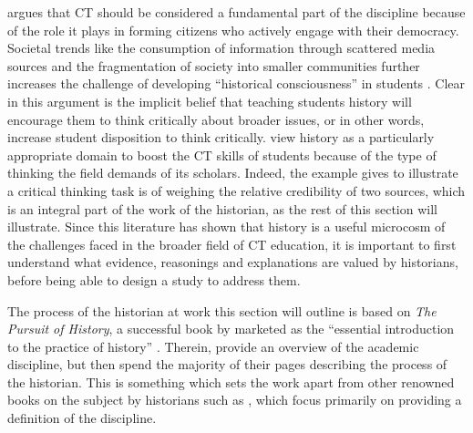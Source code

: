 \documentclass{l4proj}
\begin{document}
\citet{yogev2013need} argues that CT should be considered a fundamental part of the discipline because of the role it plays in forming citizens who actively engage with their democracy. Societal trends like the consumption of information through scattered media sources and the fragmentation of society into smaller communities further increases the challenge of developing “historical consciousness” in students \citep{yogev2013need}. Clear in this argument is the implicit belief that teaching students history will encourage them to think critically about broader issues, or in other words, increase student disposition to think critically. \citet{mclaughlin2017explicitly} view history as a particularly appropriate domain to boost the CT skills of students because of the type of thinking the field demands of its scholars. Indeed, the example \citet{halpern1998teaching} gives to illustrate a critical thinking task is of weighing the relative credibility of two sources, which is an integral part of the work of the historian, as the rest of this section will illustrate. Since this literature has shown that history is a useful microcosm of the challenges faced in the broader field of CT education, it is important to first understand what evidence, reasonings and explanations are valued by historians, before being able to design a study to address them.  

The process of the historian at work this section will outline is based on \emph{The Pursuit of History}, a successful book by \citet{tosh2006pursuit} marketed as the “essential introduction to the practice of history” \citep{tosh2006pursuit}. Therein, \citet{tosh2006pursuit} provide an overview of the academic discipline, but then spend the majority of their pages describing the process of the historian. This is something which sets the work apart from other renowned books on the subject by historians such as \citet{carr2018history}, which focus primarily on providing a definition of the discipline. 
\end{document}
